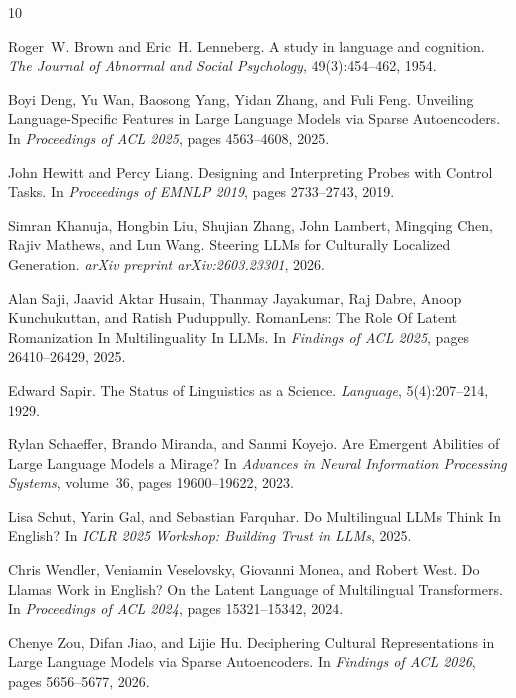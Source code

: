 \documentclass{article}
\begin{document}

\begin{thebibliography}{10}

Roger~W. Brown and Eric~H. Lenneberg.
\newblock A study in language and cognition.
\newblock \emph{The Journal of Abnormal and Social Psychology}, 49(3):454--462, 1954.

Boyi Deng, Yu Wan, Baosong Yang, Yidan Zhang, and Fuli Feng.
\newblock Unveiling Language-Specific Features in Large Language Models via Sparse Autoencoders.
\newblock In \emph{Proceedings of ACL 2025}, pages 4563--4608, 2025.

John Hewitt and Percy Liang.
\newblock Designing and Interpreting Probes with Control Tasks.
\newblock In \emph{Proceedings of EMNLP 2019}, pages 2733--2743, 2019.

Simran Khanuja, Hongbin Liu, Shujian Zhang, John Lambert, Mingqing Chen, Rajiv Mathews, and Lun Wang.
\newblock Steering LLMs for Culturally Localized Generation.
\newblock \emph{arXiv preprint arXiv:2603.23301}, 2026.

Alan Saji, Jaavid Aktar Husain, Thanmay Jayakumar, Raj Dabre, Anoop Kunchukuttan, and Ratish Puduppully.
\newblock RomanLens: The Role Of Latent Romanization In Multilinguality In LLMs.
\newblock In \emph{Findings of ACL 2025}, pages 26410--26429, 2025.

Edward Sapir.
\newblock The Status of Linguistics as a Science.
\newblock \emph{Language}, 5(4):207--214, 1929.

Rylan Schaeffer, Brando Miranda, and Sanmi Koyejo.
\newblock Are Emergent Abilities of Large Language Models a Mirage?
\newblock In \emph{Advances in Neural Information Processing Systems}, volume~36, pages 19600--19622, 2023.

Lisa Schut, Yarin Gal, and Sebastian Farquhar.
\newblock Do Multilingual LLMs Think In English?
\newblock In \emph{ICLR 2025 Workshop: Building Trust in LLMs}, 2025.

Chris Wendler, Veniamin Veselovsky, Giovanni Monea, and Robert West.
\newblock Do Llamas Work in English? On the Latent Language of Multilingual Transformers.
\newblock In \emph{Proceedings of ACL 2024}, pages 15321--15342, 2024.

Chenye Zou, Difan Jiao, and Lijie Hu.
\newblock Deciphering Cultural Representations in Large Language Models via Sparse Autoencoders.
\newblock In \emph{Findings of ACL 2026}, pages 5656--5677, 2026.

\end{thebibliography}
\end{document}

